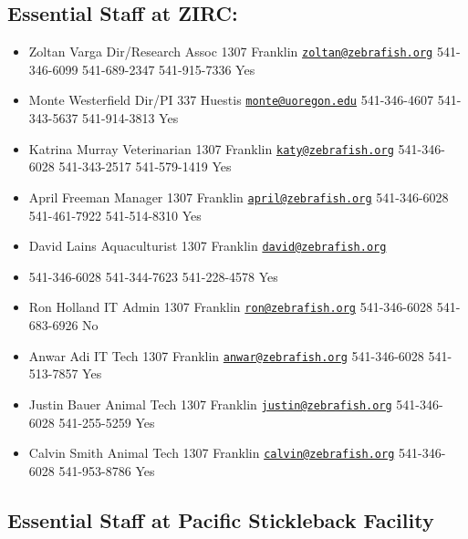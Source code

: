 \documentclass[
]{book}
\providecommand{\tightlist}{%
  \setlength{\itemsep}{0pt}\setlength{\parskip}{0pt}}
\begin{document}
\hypertarget{essential-staff-at-zirc}{%
\subsection{Essential Staff at ZIRC:}\label{essential-staff-at-zirc}}

\begin{itemize}
\tightlist
\item
  Zoltan Varga Dir/Research Assoc 1307 Franklin \href{mailto:zoltan@zebrafish.org}{\nolinkurl{zoltan@zebrafish.org}} 541-346-6099 541-689-2347 541-915-7336 Yes
\item
  Monte Westerfield Dir/PI 337 Huestis \href{mailto:monte@uoregon.edu}{\nolinkurl{monte@uoregon.edu}} 541-346-4607 541-343-5637 541-914-3813 Yes
\item
  Katrina Murray Veterinarian 1307 Franklin \href{mailto:katy@zebrafish.org}{\nolinkurl{katy@zebrafish.org}} 541-346-6028 541-343-2517 541-579-1419 Yes
\item
  April Freeman Manager 1307 Franklin \href{mailto:april@zebrafish.org}{\nolinkurl{april@zebrafish.org}} 541-346-6028 541-461-7922 541-514-8310 Yes
\item
  David Lains Aquaculturist 1307 Franklin \href{mailto:david@zebrafish.org}{\nolinkurl{david@zebrafish.org}}
\item
  541-346-6028 541-344-7623 541-228-4578 Yes
\item
  Ron Holland IT Admin 1307 Franklin \href{mailto:ron@zebrafish.org}{\nolinkurl{ron@zebrafish.org}} 541-346-6028 541-683-6926 No
\item
  Anwar Adi IT Tech 1307 Franklin \href{mailto:anwar@zebrafish.org}{\nolinkurl{anwar@zebrafish.org}} 541-346-6028 541-513-7857 Yes
\item
  Justin Bauer Animal Tech 1307 Franklin \href{mailto:justin@zebrafish.org}{\nolinkurl{justin@zebrafish.org}} 541-346-6028 541-255-5259 Yes
\item
  Calvin Smith Animal Tech 1307 Franklin \href{mailto:calvin@zebrafish.org}{\nolinkurl{calvin@zebrafish.org}} 541-346-6028 541-953-8786 Yes
\end{itemize}

\hypertarget{essential-staff-at-pacific-stickleback-facility}{%
\subsection{Essential Staff at Pacific Stickleback Facility}\label{essential-staff-at-pacific-stickleback-facility}}
\end{document}
